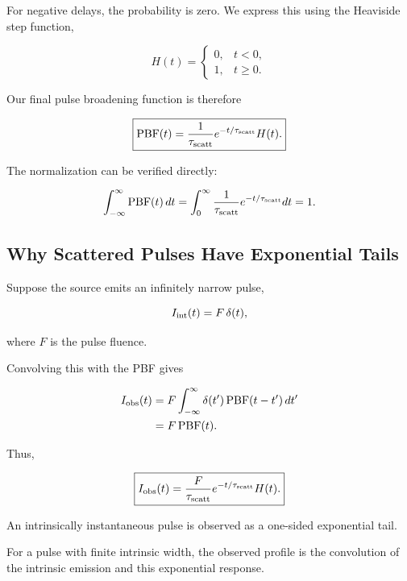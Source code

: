 For negative delays, the probability is zero.
We express this using the Heaviside step function,

\begin{equation}
H(t)=
\begin{cases}
0,&t<0,\\
1,&t\geq0.
\end{cases}
\end{equation}

Our final pulse broadening function is therefore

\begin{equation}
\boxed{
\mathrm{PBF}(t)
=
\frac{1}{\tau_{\rm scatt}}
e^{-t/\tau_{\rm scatt}}H(t).
}
\end{equation}

The normalization can be verified directly:

\begin{equation}
\int_{-\infty}^{\infty}
\mathrm{PBF}(t)\,dt
=
\int_0^\infty
\frac{1}{\tau_{\rm scatt}}
e^{-t/\tau_{\rm scatt}}dt
=1.
\end{equation}

\subsection{Why Scattered Pulses Have Exponential Tails}

Suppose the source emits an infinitely narrow pulse,

\begin{equation}
I_{\rm int}(t)=F\,\delta(t),
\end{equation}

where $F$ is the pulse fluence.

Convolving this with the PBF gives

\begin{align}
I_{\rm obs}(t)
&=
F\int_{-\infty}^{\infty}
\delta(t')\,\mathrm{PBF}(t-t')\,dt'\\
&=F\,\mathrm{PBF}(t).
\end{align}

Thus,

\begin{equation}
\boxed{
I_{\rm obs}(t)
=
\frac{F}{\tau_{\rm scatt}}
e^{-t/\tau_{\rm scatt}}H(t).
}
\end{equation}

An intrinsically instantaneous pulse is observed as
a one-sided exponential tail.

For a pulse with finite intrinsic width, the observed
profile is the convolution of the intrinsic emission
and this exponential response.


